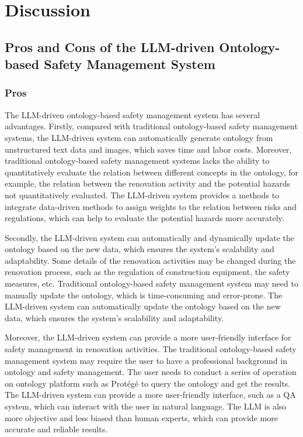 \section*{Discussion}
\label{sec:discussion}
\subsection*{Pros and Cons of the LLM-driven Ontology-based Safety Management System}
\subsubsection{Pros}
The LLM-driven ontology-based safety management system has several advantages.
Firstly, compared with traditional ontology-based safety management systems, 
the LLM-driven system can automatically generate ontology from unstructured text data and images, which saves time and labor costs.
Moreover, traditional ontology-based safety management systems lacks the ability to quantitatively evaluate the relation between 
different concepts in the ontology, for example, the relation between the renovation activity and the potential hazards not quantitatively evaluated.
The LLM-driven system provides a methods to integrate data-driven methods to assign weights to the relation between risks and regulations,
which can help to evaluate the potential hazards more accurately.

Secondly, the LLM-driven system can automatically and dynamically update the ontology based on the new data, which ensures the system's scalability and adaptability.
Some details of the renovation activities may be changed during the renovation process, such as the regulation of construction equipment, the safety measures, etc.
Traditional ontology-based safety management system may need to manually update the ontology, which is time-consuming and error-prone.
The LLM-driven system can automatically update the ontology based on the new data, which ensures the system's scalability and adaptability.

Moreover, the LLM-driven system can provide a more user-friendly interface for safety management in renovation activities.
The traditional ontology-based safety management system may require the user to have a professional background in ontology and safety management.
The user needs to conduct a series of operation on ontology platform such as Protégé to query the ontology and get the results.
The LLM-driven system can provide a more user-friendly interface, such as a QA system, which can interact with the user in natural language.
The LLM is also more objective and less biased than human experts, which can provide more accurate and reliable results.

